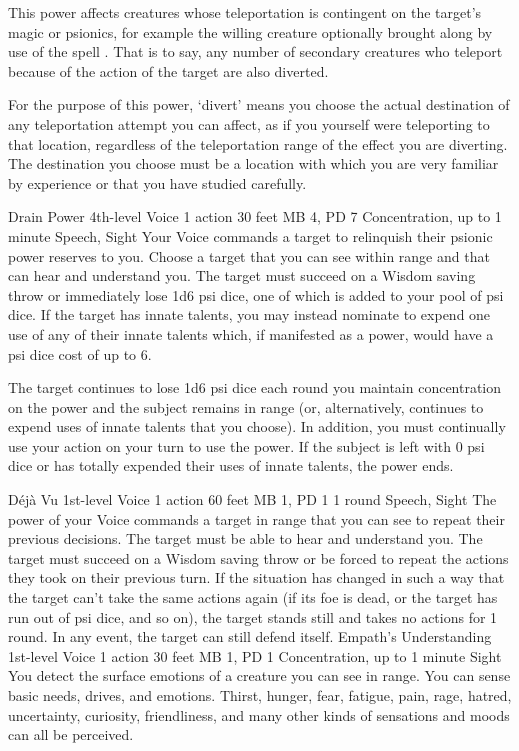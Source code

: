 This power affects creatures whose teleportation is contingent
on the target's magic or psionics, for example the willing creature
optionally brought along by use of the spell .
That is to say, any number of secondary creatures
who teleport because of the action of the target are also diverted.  

For the purpose of this power, `divert' means you choose
the actual destination of any teleportation attempt you can
affect, as if you yourself were teleporting to that location,
regardless of the teleportation range of the effect you are
diverting. The destination you choose must be a location with
which you are very familiar by experience or that you have
studied carefully.

\DndPowerHeader%
    {Drain Power\label{pwr:drain_power}}
    {4th-level Voice}
    {1 action}
    {30 feet}
    {MB 4, PD 7}
    {Concentration, up to 1 minute}
    {Speech, Sight}
Your Voice commands a target to relinquish
their psionic power reserves to you. Choose a target that
you can see within range
and that can hear and understand you.
The target must succeed on a Wisdom
saving throw or immediately lose 1d6 psi dice, one of which
is added to your pool of psi dice. If the target has innate
talents, you may instead nominate to expend one use of any
of their innate talents which,
if manifested as a power,
would have a psi dice cost of up to 6.

The target continues to lose 1d6 psi dice each round you maintain
concentration on the power and the subject remains in range
(or, alternatively, continues to expend uses of innate talents
that you choose). In addition, you must continually use your
action on your turn to use the power. If the subject is left
with 0 psi dice or has totally expended their uses of innate
talents, the power ends.

\DndPowerHeader%
    {Déjà Vu\label{pwr:déjà_vu}}
    {1st-level Voice}
    {1 action}
    {60 feet}
    {MB 1, PD 1}
    {1 round}
    {Speech, Sight}
The power of your Voice commands a target
in range that you can see to repeat their previous decisions.
The target must be able to hear and understand you.
The target must succeed on a Wisdom saving throw or be forced
to repeat the actions they took on their previous turn. If
the situation has changed in such a way that the target can't
take the same actions again (if its foe is dead, or the target
has run out of psi dice, and so on), the target stands still
and takes no actions for 1 round. In any event, the target
can still defend itself.
\DndPowerHeader%
    {Empath's Understanding\label{pwr:empaths_understanding}}
    {1st-level Voice}
    {1 action}
    {30 feet}
    {MB 1, PD 1}
    {Concentration, up to 1 minute}
    {Sight}
You detect the surface emotions of a creature
you can see in range. You can sense basic needs, drives, and
emotions. Thirst, hunger, fear, fatigue, pain, rage, hatred,
uncertainty, curiosity, friendliness, and many other kinds
of sensations and moods can all be perceived.

